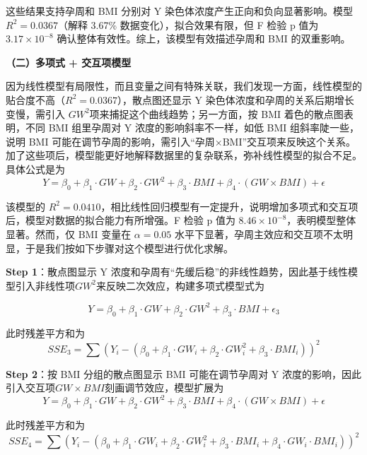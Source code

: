 \documentclass[withoutpreface,bwprint]{cumcmthesis} %
\begin{document}
这些结果支持孕周和 BMI 分别对 Y 染色体浓度产生正向和负向显著影响。模型 $R^2 = 0.0367$（解释 3.67\% 数据变化），拟合效果有限，但 F 检验 p 值为 $3.17 \times 10^{-8}$
确认整体有效性。综上，该模型有效描述孕周和 BMI 的双重影响。


\textbf{（二）多项式 + 交互项模型}

因为线性模型有局限性，而且变量之间有特殊关联，我们发现一方面，线性模型的贴合度不高（$R^2=0.0367$），散点图还显示 Y 染色体浓度和孕周的关系后期增长变慢，需引入 $GW^2$项来捕捉这个曲线趋势；另一方面，按 BMI 着色的散点图表明，不同 BMI 组里孕周对 Y 浓度的影响斜率不一样，如低 BMI 组斜率陡一些，说明 BMI 可能在调节孕周的影响，需引入“孕周×BMI”交互项来反映这个关系。加了这些项后，模型能更好地解释数据里的复杂联系，弥补线性模型的拟合不足。具体公式是为
\begin{equation}
    \label{eq:多项式 + 交互项模型}
    Y = \beta_0 + \beta_1 \cdot GW + \beta_2 \cdot GW^2 + \beta_3 \cdot BMI + \beta_4 \cdot (GW \times BMI) + \epsilon
\end{equation}

该模型的 $R^2 = 0.0410$，相比线性回归模型有一定提升，说明增加多项式和交互项后，模型对数据的拟合能力有所增强。F 检验 p 值为 $8.46 \times 10^{-8}$，表明模型整体显著。然而，仅 BMI 变量在 $\alpha = 0.05$ 水平下显著，孕周主效应和交互项不太明显，于是我们按如下步骤对这个模型进行优化求解。

\textbf{Step 1}：散点图显示 Y 浓度和孕周有“先缓后稳”的非线性趋势，因此基于线性模型引入非线性项$GW^2$来反映二次效应，构建多项式模型式为

\begin{equation}
    Y = \beta_0 + \beta_1 \cdot GW + \beta_2 \cdot GW^2 + \beta_3 \cdot BMI + \epsilon_3
\end{equation}

此时残差平方和为
\begin{equation}
    SSE_3 = \sum (Y_i - (\beta_0 + \beta_1 \cdot GW_i + \beta_2 \cdot GW_i^2 + \beta_3 \cdot BMI_i))^2
\end{equation}

\textbf{Step 2}：按 BMI 分组的散点图显示 BMI 可能在调节孕周对 Y 浓度的影响，因此引入交互项$GW \times BMI$刻画调节效应，模型扩展为
  \begin{equation}
    Y = \beta_0 + \beta_1 \cdot GW + \beta_2 \cdot GW^2 + \beta_3 \cdot BMI + \beta_4 \cdot (GW \times BMI) + \epsilon
  \end{equation} 
  
  此时残差平方和为
  \begin{equation}
    SSE_4 = \sum (Y_i - (\beta_0 + \beta_1 \cdot GW_i + \beta_2 \cdot GW_i^2 + \beta_3 \cdot BMI_i + \beta_4 \cdot GW_i \cdot BMI_i))^2
  \end{equation}
\end{document}
